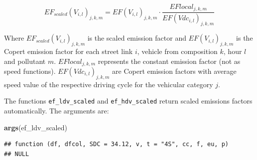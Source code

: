 \documentclass[12pt,graybox,envcountchap,sectrefs]{krantz}
\makeatletter
\newenvironment{Shaded}{\begin{snugshade}}{\end{snugshade}}
\newcommand{\KeywordTok}[1]{\textcolor[rgb]{0.13,0.29,0.53}{\textbf{#1}}}
\newcommand{\NormalTok}[1]{#1}
\newenvironment{kframe}{%
\medskip{}
\setlength{\fboxsep}{.8em}
 \def\at@end@of@kframe{}%
 \ifinner\ifhmode%
  \def\at@end@of@kframe{\end{minipage}}%
  \begin{minipage}{\columnwidth}%
 \fi\fi%
 \def\FrameCommand##1{\hskip\@totalleftmargin \hskip-\fboxsep
 \colorbox{shadecolor}{##1}\hskip-\fboxsep
     \hskip-\linewidth \hskip-\@totalleftmargin \hskip\columnwidth}%
 \MakeFramed {\advance\hsize-\width
   \@totalleftmargin\z@ \linewidth\hsize
   \@setminipage}}%
 {\par\unskip\endMakeFramed%
 \at@end@of@kframe}
\renewenvironment{Shaded}{\begin{kframe}}{\end{kframe}}
\theoremstyle{definition}
\theoremstyle{definition}
\theoremstyle{definition}
\theoremstyle{remark}
\makeatother
\begin{document}
\begin{equation}
EF_{scaled}(V_{i,l})_{j,k,m}=EF(V_{i,l})_{j,k,m} \cdot \frac{EFlocal_{j,k,m}}{{EF(Vdc_{i,l})_{j,k,m}}}
\label{eq:efscaled}
\end{equation}

Where \(EF_{scaled}(V_{i,l})_{j,k,m}\) is the scaled emission factor and
\(EF(V_{i,l})_{j,k,m}\) is the Copert emission factor for each street
link \(i\), vehicle from composition \(k\), hour \(l\) and pollutant
\(m\). \(EFlocal_{j,k,m}\) represents the constant emission factor (not
as speed functions). \(EF(Vdc_{i,l})_{j,k,m}\) are Copert emission
factors with average speed value of the respective driving cycle for the
vehicular category \(j\).

The functions \texttt{ef\_ldv\_scaled} and \texttt{ef\_hdv\_scaled}
return scaled emissions factors automatically. The arguments are:

\begin{Shaded}
\begin{Highlighting}[]
\KeywordTok{args}\NormalTok{(ef_ldv_scaled)}
\end{Highlighting}
\end{Shaded}

\begin{verbatim}
## function (df, dfcol, SDC = 34.12, v, t = "4S", cc, f, eu, p) 
## NULL
\end{verbatim}
\end{document}
